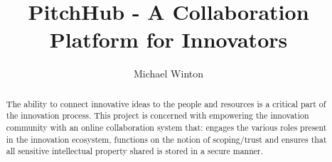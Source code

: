 \documentclass[11pt
              , a4paper
              , twoside
              , openright
              ]{report}
\title{PitchHub - A Collaboration Platform for Innovators}
\author{Michael Winton}
\date{}
\begin{document}
\frontmatter



\begin{abstract}

The ability to connect innovative ideas to the people and resources is a critical part of the innovation process. This project is concerned with empowering the innovation community with an online collaboration system that: engages the various roles present in the innovation ecosystem, functions on the notion of scoping/trust and ensures that all sensitive intellectual property shared is stored in a secure manner. 

\end{abstract}


\maketitle

% 

\tableofcontents



\mainmatter













% 
% 


\backmatter





\end{document}
